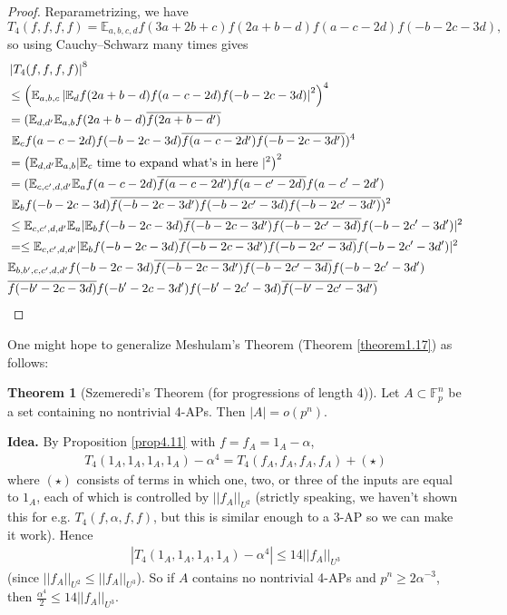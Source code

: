 \documentclass{article}
\theoremstyle{definition}
\newtheorem{theorem}{Theorem}[section]
\begin{document}
\begin{proof}
    Reparametrizing, we have $$T_4(f,f,f,f) = \mathbb{E}_{a,b,c,d}f(3a+2b+c)f(2a+b-d)f(a-c-2d)f(-b-2c-3d),$$
    so using Cauchy--Schwarz many times gives
    \begin{align*}
        &\left|T_4(f,f,f,f)\right|^8\\
        &\le \left(\mathbb{E}_{a,b,c} \left|\mathbb{E}_d f(2a+b-d)f(a-c-2d)f(-b-2c-3d)\right|^2 \right)^4 \\
        &= (\mathbb{E}_{d,d'} \mathbb{E}_{a,b} f(2a+b-d)\overline{f(2a+b-d')}\\
        &~\mathbb{E}_c f(a-c-2d)f(-b-2c-3d)\overline{f(a-c-2d')f(-b-2c-3d')})^4 \\
        &= \left(\mathbb{E}_{d,d'}\mathbb{E}_{a,b}|\mathbb{E}_c \text{ time to expand what's in here }|^2\right)^2 \\
        &= (\mathbb{E}_{c,c',d,d'} \mathbb{E}_a f(a-c-2d)\overline{f(a-c-2d')}\overline{f(a-c'-2d)}f(a-c'-2d')\\
        &~ \mathbb{E}_b f(-b-2c-3d)\overline{f(-b-2c-3d')}\overline{f(-b-2c'-3d)f(-b-2c'-3d')} )^2 \\
        &\le \mathbb{E}_{c,c',d,d'} \mathbb{E}_a | \mathbb{E}_b f(-b-2c-3d)\overline{f(-b-2c-3d')f(-b-2c'-3d)}f(-b-2c'-3d')|^2\\
        &= \le \mathbb{E}_{c,c',d,d'} | \mathbb{E}_b f(-b-2c-3d)\overline{f(-b-2c-3d')f(-b-2c'-3d)}f(-b-2c'-3d')|^2\\
        &\mathbb{E}_{b,b',c,c',d,d'} f(-b-2c-3d)\overline{f(-b-2c-3d')f(-b-2c'-3d)}f(-b-2c'-3d')\\
        &\overline{f(-b'-2c-3d)}f(-b'-2c-3d')f(-b'-2c'-3d)\overline{f(-b'-2c'-3d')}
        \qedhere
    \end{align*}
\end{proof}
One might hope to generalize Meshulam's Theorem (Theorem \ref{theorem1.17}) as follows:
\begin{theorem}[Szemeredi's Theorem (for progressions of length 4)]\label{theorem4.12} 
    Let $A \subset \mathbb{F}_p^n$ be a set containing no nontrivial 4-APs. Then $\left|A\right| = o(p^n).$
\end{theorem}
\textbf{Idea.} By Proposition \ref{prop4.11} with $f = f_A = 1_A -\alpha$, 
\begin{align*}
    T_4(1_A,1_A,1_A,1_A)-\alpha^4 = T_4(f_A,f_A,f_A,f_A) + (\star)
\end{align*} 
where $(\star)$ consists of terms in which one, two, or three of the inputs are equal to $1_A$, each of which is controlled by $||f_A||_{U^2}$ (strictly speaking, we haven't shown this for e.g. $T_4(f,\alpha,f,f)$, but this is similar enough to a 3-AP so we can make it work). Hence 
\begin{align*}
    \left|T_4(1_A,1_A,1_A,1_A)-\alpha^4\right| \le 14||f_A||_{U^3}
\end{align*}
(since $||f_A||_{U^2}\le ||f_A||_{U^3}$). So if $A$ contains no nontrivial 4-APs and $p^n \ge 2\alpha^{-3}$, then $\frac{\alpha^4}{2}\le 14||f_A||_{U^3}$.
\vspace{1mm}
 
\end{document}
